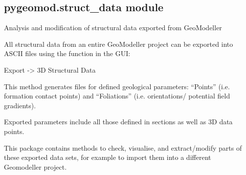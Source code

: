 \documentclass[letterpaper,10pt,english]{sphinxmanual}
\begin{document}
\subsection{pygeomod.struct\_data module}
\label{pygeomod:module-pygeomod.struct_data}\label{pygeomod:pygeomod-struct-data-module}
Analysis and modification of structural data exported from GeoModeller

All structural data from an entire GeoModeller project can be exported into ASCII
files using the function in the GUI:

Export -\textgreater{} 3D Structural Data

This method generates files for defined geological parameters:
``Points'' (i.e. formation contact points) and
``Foliations'' (i.e. orientations/ potential field gradients).

Exported parameters include all those defined in sections as well as 3D data points.

This package contains methods to check, visualise, and extract/modify parts of these
exported data sets, for example to import them into a different Geomodeller project.
\end{document}
